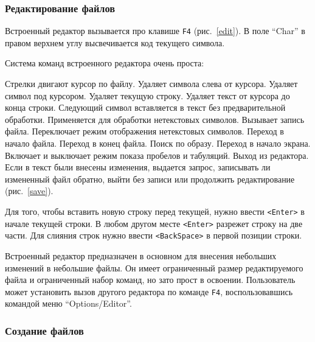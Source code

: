 \subsubsection{Редактирование файлов}


Встроенный редактор вызывается про клавише {\tt F4} (рис.~\ref{edit}).
В поле ``Char'' в правом верхнем углу высвечивается код текущего символа.

Система команд встроенного редактора очень проста:

\begin{example}
\litem{$\uparrow$ $\downarrow$ $\leftarrow$ $\rightarrow$}
Стрелки двигают курсор по файлу.
Удаляет символа слева от курсора.
Удаляет символ под курсором.
Удаляет текущую строку.
Удаляет текст от курсора до конца строки.
Следующий символ вставляется в текст без предварительной обработки.
Применяется для обработки нетекстовых символов.
Вызывает запись файла.
Переключает режим отображения нетекстовых символов.
Переход в начало файла.
Переход в конец файла.
Поиск по образу.
Переход в начало экрана.
Включает и выключает режим показа пробелов и табуляций.
Выход из редактора. Если в текст были внесены изменения,
выдается запрос, записывать ли измененный файл обратно,
выйти без записи или продолжить редактирование (рис.~\ref{save}).
\end{example}


Для того, чтобы вставить новую строку перед
текущей, нужно ввести {\tt <Enter>} в
начале текущей строки. В любом другом месте {\tt <Enter>}
разрежет строку на две части. Для слияния строк нужно ввести {\tt <BackSpace>}
в первой позиции строки.

Встроенный редактор предназначен в основном для внесения
небольших изменений в небольшие файлы. Он имеет ограниченный
размер редактируемого файла и ограниченный набор команд,
но зато прост в освоении. Пользователь может установить
вызов другого редактора по команде {\tt F4}, воспользовавшись
командой меню ``Options/Editor''.

\subsubsection{Создание файлов}

